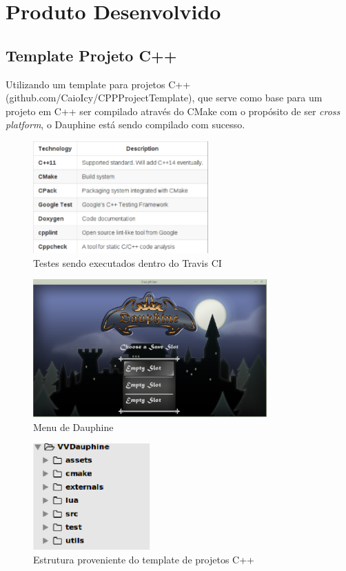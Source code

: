 \chapter[Produto Desenvolvido]{Produto Desenvolvido}

\section {Template Projeto C++}

Utilizando um template para projetos C++ (github.com/CaioIcy/CPP\textunderscore Project\textunderscore Template), que serve como base para um projeto em C++ ser compilado através do CMake com o propósito de ser \textit{cross platform}, o Dauphine
está sendo compilado com sucesso.

\begin{figure}[h]
	\centering
	\includegraphics[width=0.6\textwidth]{figuras/cpp_template.eps}
	\caption{Testes sendo executados dentro do Travis CI}
	\label{img:cpp_template}
\end{figure}

\begin{figure}[h]
	\centering
	\includegraphics[width=0.8\textwidth]{figuras/vv_dauphine.eps}
	\caption{Menu de Dauphine}
	\label{img:dauphine}
\end{figure}

\begin{figure}[h]
	\centering
	\includegraphics[width=0.4\textwidth]{figuras/vv_cp3t.eps}
	\caption{Estrutura proveniente do template de projetos C++}
	\label{img:cp3t}
\end{figure}


